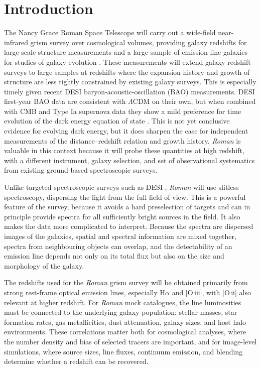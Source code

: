 \documentclass[twocolumn, apj, numberedappendix, iop]{openjournal}
\newcommand{\romanspace}{\textit{Roman}\xspace}
\newcommand{\ha}{H$\alpha$}
\newcommand{\oii}{[O\,{\sc ii}]}
\newcommand{\oiii}{[O\,{\sc iii}]}
\begin{document}
\maketitle

\section{Introduction}

The Nancy Grace Roman Space Telescope will carry out a wide-field near-infrared grism survey over cosmological volumes, providing galaxy redshifts for large-scale structure measurements and a large sample of emission-line galaxies for studies of galaxy evolution \citep{2015arXiv150303757S, 2022ApJ...928....1W}.
These measurements will extend galaxy redshift surveys to large samples at redshifts where the expansion history and growth of structure are less tightly constrained by existing galaxy surveys.
This is especially timely given recent DESI baryon-acoustic-oscillation (BAO) measurements.
DESI first-year BAO data are consistent with $\Lambda$CDM on their own, but when combined with CMB and Type Ia supernova data they show a mild preference for time evolution of the dark energy equation of state \citep{2025JCAP...02..021D}.
This is not yet conclusive evidence for evolving dark energy, but it does sharpen the case for independent measurements of the distance--redshift relation and growth history.
\romanspace{}  is valuable in this context because it will probe these quantities at high redshift, with a different instrument, galaxy selection, and set of observational systematics from existing ground-based spectroscopic surveys.

Unlike targeted spectroscopic surveys such as DESI \citep{2016arXiv161100036D}, \romanspace{}  will use slitless spectroscopy, dispersing the light from the full field of view.
This is a powerful feature of the survey, because it avoids a hard preselection of targets and can in principle provide spectra for all sufficiently bright sources in the field.
It also makes the data more complicated to interpret.
Because the spectra are dispersed images of the galaxies, spatial and spectral information are mixed together, spectra from neighbouring objects can overlap, and the detectability of an emission line depends not only on its total flux but also on the size and morphology of the galaxy.

The redshifts used for the \romanspace{}  grism survey will be obtained primarily from strong rest-frame optical emission lines, especially \ha{} and \oiii, with \oii{} also relevant at higher redshift.
For \romanspace{}  mock catalogues, the line luminosities must be connected to the underlying galaxy population: stellar masses, star formation rates, gas metallicities, dust attenuation, galaxy sizes, and host halo environments.
These correlations matter both for cosmological analyses, where the number density and bias of selected tracers are important, and for image-level simulations, where source sizes, line fluxes, continuum emission, and blending determine whether a redshift can be recovered.
\end{document}

